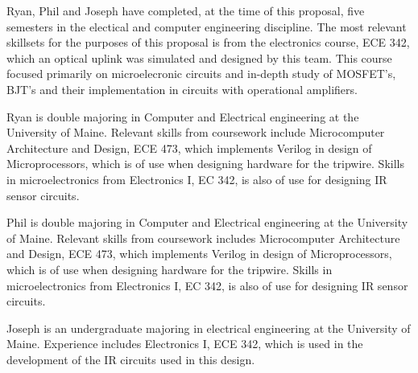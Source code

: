 
	
Ryan, Phil and Joseph have completed, at the time of this proposal, five semesters in the electical and computer engineering discipline. The most relevant skillsets for the purposes of this proposal is from the electronics course, ECE 342, which an optical uplink was simulated and designed by this team. This course focused primarily on microelecronic circuits and in-depth study of MOSFET's, BJT's and their implementation in circuits with operational amplifiers. 

Ryan is double majoring in Computer and Electrical engineering at the University of Maine. Relevant skills from coursework include Microcomputer Architecture and Design, ECE 473, which implements Verilog in design of Microprocessors, which is of use when designing hardware for the tripwire. Skills in microelectronics from Electronics I, EC 342, is also of use for designing IR sensor circuits.

Phil is double majoring in Computer and Electrical engineering at the University of Maine. Relevant skills from coursework includes Microcomputer Architecture and Design, ECE 473, which implements Verilog in design of Microprocessors, which is of use when designing hardware for the tripwire. Skills in microelectronics from Electronics I, EC 342, is also of use for designing IR sensor circuits.

Joseph is an undergraduate majoring in electrical engineering at the University of Maine. Experience includes Electronics I, ECE 342, which is used in the development of the IR circuits used in this design.
